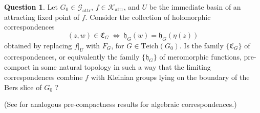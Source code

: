 \documentclass[11pt,a4paper, oneside]{amsart}
\theoremstyle{definition}
\newtheorem{question}[thm]{Question}
\theoremstyle{remark}
\numberwithin{equation}{section}
\newcommand{\attr}{{\text{attr}}}
\begin{document}
\begin{question}\label{pre_compactness_qstn}
Let $G_0\in\mathscr G_{\attr}$, $f\in\mathscr K_{\attr}$, and $U$ be the immediate basin of an attracting fixed point of $f$. Consider the collection of holomorphic correspondences 
$$
(z,w) \in \mathfrak{C}_G \ \iff\ \mathfrak{h}_G(w)=\mathfrak{h}_G(\eta(z))
$$ 
obtained by replacing $f\vert_{U}$ with $F_G$, for $G\in\mathrm{Teich}(G_0)$.
Is the family $\{\mathfrak{C}_G\}$ of correspondences, or equivalently the family $\{\mathfrak{h}_G\}$ of meromorphic functions, pre-compact in some natural topology in such a way that the limiting correspondences combine $f$ with Kleinian groups lying on the boundary of the Bers slice of $G_0$ ?
\end{question}
\noindent (See \cite{LMM26} for analogous pre-compactness results for algebraic correspondences.)
\end{document}
